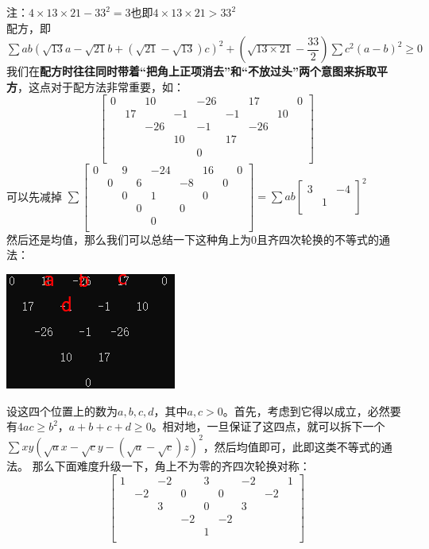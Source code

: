 \documentclass[UTF8]{ctexart}
\begin{document}
注：$ 4\times 13\times 21-33^{2}=3 $也即$ 4\times 13\times 21>33^{2} $\\
配方，即$ \displaystyle \sum ab(\sqrt{13}a-\sqrt{21}b+(\sqrt{21}-\sqrt{13})c)^{2}+(\sqrt{13\times 21}-\dfrac{33}{2})\displaystyle \sum c^{2}(a-b)^{2} \geq 0$\\
我们在\textbf{配方时往往同时带着“把角上正项消去”和“不放过头”两个意图来拆取平方}，这点对于配方法非常重要，如：\\
\renewcommand*{\arraystretch}{1.732}\[
\left[\begin{matrix}
	0& &10& &-26& &17& &0\\
	&17& &-1& &-1& &10&\\
	& &-26& &-1& &-26& &\\
	& & &10& &17& & &\\
	& & & &0& & & &\\
\end{matrix}\right]
\]
可以先减掉
$\displaystyle \sum 
\left[\begin{matrix}
	0& &9& &-24& &16& &0\\
	&0& &6& &-8& &0&\\
	& &0& &1& &0& &\\
	& & &0& &0& & &\\
	& & & &0& & & &\\
\end{matrix}\right]
=\displaystyle \sum ab
\left[\begin{matrix}
	3& &-4 \\
	& 1&\\
\end{matrix}\right]^{2} $\\
然后还是均值，那么我们可以总结一下这种角上为0且齐四次轮换的不等式的通法：
\begin{center}
	\includegraphics[width=0.3\linewidth]{0330}
\end{center}
设这四个位置上的数为$ a,b,c,d $，其中$ a,c> 0 $。首先，考虑到它得以成立，必然要有$ 4ac\ge b^{2} $，$ a+b+c+d\geq 0 $。相对地，一旦保证了这四点，就可以拆下一个\\
$ \displaystyle \sum xy(\sqrt{a}x-\sqrt{c}y-(\sqrt{a}-\sqrt{c})z)^{2} $，然后均值即可，此即这类不等式的通法。
那么下面难度升级一下，角上不为零的齐四次轮换对称：
\renewcommand*{\arraystretch}{1.732}\[
\left[\begin{matrix}
	1& &-2& &3& &-2& &1\\
	&-2& &0& &0& &-2&\\
	& &3& &0& &3& &\\
	& & &-2& &-2& & &\\
	& & & &1& & & &\\
\end{matrix}\right]
\]
\end{document}
